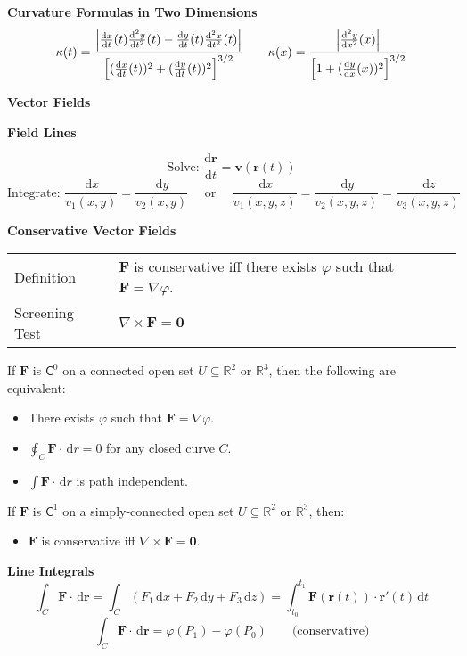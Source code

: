 \documentclass[10pt]{article}
\newcommand\sectionheading[1]{\begin{center}\large{\textbf{#1}}\end{center}\normalsize}
\newcommand\heading[1]{\smallskip\textbf{#1}\smallskip}
\newcommand{\C}{{\mathsf C}}
\newcommand{\R}{{\mathbb R}}
\newcommand{\ka}{\kappa}
\renewcommand{\phi}{\varphi}
\newcommand{\norm}[1]{\left|#1\right|}
\newcommand{\bv}[1]{\mathbf{#1}}                                %
\newcommand{\F}{\bv F}
\renewcommand{\r}{\bv r}
\renewcommand{\v}{\bv v}
\renewcommand{\d}{\,\mathrm{d}}
\newcommand{\dv}[2]{\frac{\mathrm{d} #1}{\mathrm{d} #2}}
\newcommand{\ddv}[2]{\frac{\mathrm{d}^2 #1}{\mathrm{d} #2^2}}
\newcommand{\grad}{\nabla}
\newcommand{\curl}{\nabla\times}
\begin{document}
\begin{multicols*}{2}
\heading{Curvature Formulas in Two Dimensions}
\[\ka(t)=\frac{\norm{\dv xt(t)\ddv yt(t)-\dv yt(t)\ddv xt(t)}}{\Bigl[(\dv xt(t))^2+(\dv yt(t))^2\Bigr]^{3/2}} \qquad \ka(x)=\frac{\norm{\ddv yx(x)}}{\Bigl[1+(\dv yx(x))^2\Bigr]^{3/2}}\]




\sectionheading{Vector Fields}

\heading{Field Lines}

\[\text{Solve: }\dv\r t=\v(\r(t))\]
\[\text{Integrate: }\frac{\d x}{v_1(x,y)}=\frac{\d y}{v_2(x,y)} \quad\text{ or }\quad \frac{\d x}{v_1(x,y,z)}=\frac{\d y}{v_2(x,y,z)}=\frac{\d z}{v_3(x,y,z)}\]

\heading{Conservative Vector Fields}

\medskip
\begin{tabular}{@{}ll}
    Definition & $\F$ is conservative iff there exists $\phi$ such that $\F=\grad\phi$. \\
    Screening Test & $\curl\F=\bv 0$ \\    
\end{tabular}
\medskip

If $\F$ is $\C^0$ on a connected open set $U\subseteq\R^2$ or $\R^3$, then the following are equivalent:
\begin{itemize}[noitemsep,topsep=4pt]
    \item There exists $\phi$ such that $\F=\grad\phi$.
    \item $\oint_C\F\cdot\bv\d r=0$ for any closed curve $C$.
    \item $\int\F\cdot\bv\d r$ is path independent.
\end{itemize}

\newcolumn
If $\F$ is $\C^1$ on a simply-connected open set $U\subseteq\R^2$ or $\R^3$, then:
\begin{itemize}[itemsep=0pt,topsep=4pt]
    \item $\F$ is conservative iff $\curl\F=\bv 0$.
\end{itemize}

\heading{Line Integrals}
\[\int_C\F\cdot\d\r=\int_C(F_1\d x+F_2\d y+F_3\d z)=\int_{t_0}^{t_1}\F(\r(t))\cdot\r'(t)\d t\]
\[\int_C\F\cdot\d\r=\phi(P_1)-\phi(P_0)\qquad\text{(conservative)}\]


\end{multicols*}
\end{document}
